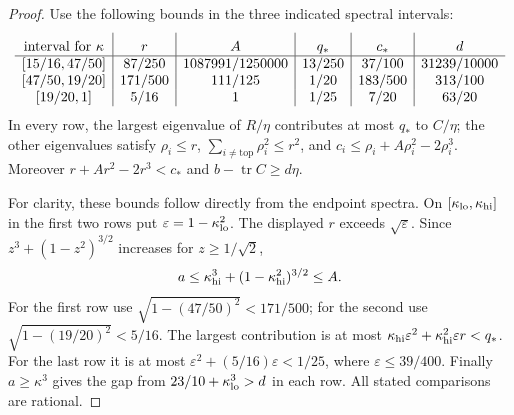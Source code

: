 \documentclass[11pt,a4paper]{article}
\numberwithin{equation}{section}
\begin{document}
\begin{proof}
Use the following bounds in the three indicated spectral intervals:
\[
\begin{array}{c|c|c|c|c|c}
 \text{interval for }\kappa&r&A&q_*&c_*&d\rule{0pt}{3ex}\\ \hline
 {}[15/16,47/50]&87/250&1087991/1250000&13/250&37/100&31239/10000\\
 {}[47/50,19/20]&171/500&111/125&1/20&183/500&313/100\\
 {}[19/20,1]&5/16&1&1/25&7/20&63/20
\end{array}
\]
In every row, the largest eigenvalue of $R/\eta$ contributes at most
$q_*$ to $C/\eta$; the other eigenvalues satisfy $\rho_i\le r$,
$\sum_{i\ne\mathrm{top}}\rho_i^2\le r^2$, and
$c_i\le\rho_i+A\rho_i^2-2\rho_i^3$.
Moreover $r+Ar^2-2r^3<c_*$ and
$b-\operatorname{tr}C\ge d\eta$.

For clarity, these bounds follow directly from the endpoint spectra.
On $[\kappa_{\rm lo},\kappa_{\rm hi}]$ in the first two rows put
$\varepsilon=1-\kappa_{\rm lo}^2$.
The displayed $r$ exceeds $\sqrt\varepsilon$.
Since $z^3+(1-z^2)^{3/2}$ increases for $z\ge1/\sqrt2$,
\[
 a\le\kappa_{\rm hi}^3+(1-\kappa_{\rm hi}^2)^{3/2}\le A.
\]
For the first row use $\sqrt{1-(47/50)^2}<171/500$; for the second
use $\sqrt{1-(19/20)^2}<5/16$.
The largest contribution is at most
$\kappa_{\rm hi}\varepsilon^2+\kappa_{\rm hi}^2\varepsilon r<q_*$.
For the last row it is at most
$\varepsilon^2+(5/16)\varepsilon<1/25$, where
$\varepsilon\le39/400$.
Finally $a\ge\kappa^3$ gives the gap from
$23/10+\kappa_{\rm lo}^3>d$ in each row.
All stated comparisons are rational.


\end{proof}
\end{document}
